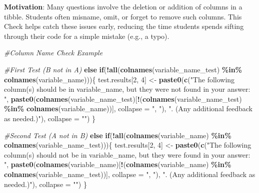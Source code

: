 \documentclass[
  12pt,
]{book}
\newenvironment{Shaded}{\begin{snugshade}}{\end{snugshade}}
\newcommand{\AttributeTok}[1]{\textcolor[rgb]{0.13,0.29,0.53}{#1}}
\newcommand{\CommentTok}[1]{\textcolor[rgb]{0.56,0.35,0.01}{\textit{#1}}}
\newcommand{\ControlFlowTok}[1]{\textcolor[rgb]{0.13,0.29,0.53}{\textbf{#1}}}
\newcommand{\DecValTok}[1]{\textcolor[rgb]{0.00,0.00,0.81}{#1}}
\newcommand{\FunctionTok}[1]{\textcolor[rgb]{0.13,0.29,0.53}{\textbf{#1}}}
\newcommand{\NormalTok}[1]{#1}
\newcommand{\OtherTok}[1]{\textcolor[rgb]{0.56,0.35,0.01}{#1}}
\newcommand{\SpecialCharTok}[1]{\textcolor[rgb]{0.81,0.36,0.00}{\textbf{#1}}}
\newcommand{\StringTok}[1]{\textcolor[rgb]{0.31,0.60,0.02}{#1}}
\begin{document}
\textbf{Motivation}: Many questions involve the deletion or addition of columns in a tibble. Students often misname, omit, or forget to remove such columns. This Check helps catch these issues early, reducing the time students spends sifting through their code for a simple mistake (e.g., a typo).

\begin{Shaded}
\begin{Highlighting}[]
\CommentTok{\#Column Name Check Example}

\CommentTok{\#First Test (B not in A)}
\ControlFlowTok{else} \ControlFlowTok{if}\NormalTok{(}\SpecialCharTok{!}\FunctionTok{all}\NormalTok{(}\FunctionTok{colnames}\NormalTok{(variable\_name\_test) }\SpecialCharTok{\%in\%} \FunctionTok{colnames}\NormalTok{(variable\_name)))\{}
\NormalTok{  test.results[}\DecValTok{2}\NormalTok{, }\DecValTok{4}\NormalTok{] }\OtherTok{\textless{}{-}} \FunctionTok{paste0}\NormalTok{(}\FunctionTok{c}\NormalTok{(}\StringTok{"The following column(s) should be in \textasciigrave{}variable\_name\textasciigrave{}, but they were not found in your answer: "}\NormalTok{,}
    \FunctionTok{paste0}\NormalTok{(}\FunctionTok{colnames}\NormalTok{(variable\_name\_test)[}\SpecialCharTok{!}\NormalTok{(}\FunctionTok{colnames}\NormalTok{(variable\_name\_test) }\SpecialCharTok{\%in\%} \FunctionTok{colnames}\NormalTok{(variable\_name))], }\AttributeTok{collapse =} \StringTok{", "}\NormalTok{), }\StringTok{". (Any additional feedback as needed.)"}\NormalTok{), }\AttributeTok{collapse =} \StringTok{""}\NormalTok{)}
\NormalTok{\} }

\CommentTok{\#Second Test (A not in B)}
\ControlFlowTok{else} \ControlFlowTok{if}\NormalTok{(}\SpecialCharTok{!}\FunctionTok{all}\NormalTok{(}\FunctionTok{colnames}\NormalTok{(variable\_name) }\SpecialCharTok{\%in\%} \FunctionTok{colnames}\NormalTok{(variable\_name\_test)))\{}
\NormalTok{  test.results[}\DecValTok{2}\NormalTok{, }\DecValTok{4}\NormalTok{] }\OtherTok{\textless{}{-}} \FunctionTok{paste0}\NormalTok{(}\FunctionTok{c}\NormalTok{(}\StringTok{"The following column(s) should not be in \textasciigrave{}variable\_name\textasciigrave{}, but they were found in your answer: "}\NormalTok{,}
    \FunctionTok{paste0}\NormalTok{(}\FunctionTok{colnames}\NormalTok{(variable\_name)[}\SpecialCharTok{!}\NormalTok{(}\FunctionTok{colnames}\NormalTok{(variable\_name) }\SpecialCharTok{\%in\%} \FunctionTok{colnames}\NormalTok{(variable\_name\_test))],}
    \AttributeTok{collapse =} \StringTok{", "}\NormalTok{), }\StringTok{". (Any additional feedback as needed.)"}\NormalTok{), }\AttributeTok{collapse =} \StringTok{""}\NormalTok{)}
\NormalTok{\}}
\end{Highlighting}
\end{Shaded}
\end{document}
